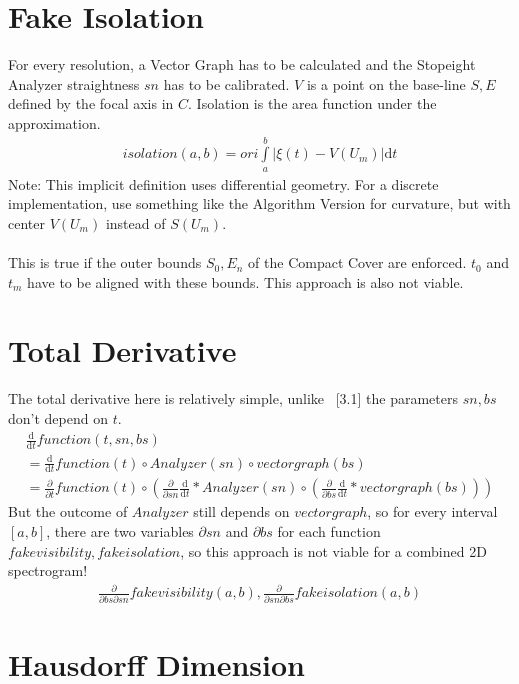 \documentclass{report}
\begin{document}
\section{Fake Isolation}
For every resolution, a Vector Graph has to be calculated and the Stopeight Analyzer straightness $sn$ has to be calibrated. $V$ is a point on the base-line $S,E$ defined by the focal axis in $C$.
Isolation is the area function under the approximation.
\begin{align}
isolation(a,b)= ori \int \limits _{a}^{b} \vert \xi(t)-V(U_{m})\vert  \mathrm{d}t
\end{align}
Note: This implicit definition uses differential geometry. For a discrete implementation, use something like the Algorithm Version for curvature, but with center $V(U_{m})$ instead of $S(U_{m})$.\\\\
This is true if the outer bounds $S_{0},E_{n}$ of the Compact Cover are enforced. $t_{0}$ and $t_{m}$ have to be aligned with these bounds.
This approach is also not viable.

\section{Total Derivative}
The total derivative here is relatively simple, unlike ~\cite{Analyzer}[3.1] the parameters $sn,bs$ don't depend on $t$.
\begin{align}
\frac{\mathrm{d}}{\mathrm{d} t} function(t,sn,bs)\\
= \frac{\mathrm{d}}{\mathrm{d} t} function(t) \circ Analyzer(sn) \circ vectorgraph(bs)\\
= \frac{\partial}{\partial t} function(t) \circ ( \frac{\partial}{\partial sn}  \frac{\mathrm{d} }{\mathrm{d}t} * Analyzer(sn) \circ (\frac{\partial}{\partial bs} \frac{\mathrm{d}}{\mathrm{d}t}*vectorgraph(bs)) )
\end{align}
But the outcome of $Analyzer$ still depends on $vectorgraph$, so for every interval $[a,b]$, there are two variables $\partial sn$ and $\partial bs$ for each function $fake visibility, fake isolation$, so this approach is not viable for a combined 2D spectrogram!
\begin{align}
\frac{\partial}{\partial bs\partial sn} fakevisibility(a,b),\frac{\partial}{\partial sn\partial bs} fakeisolation(a,b)
\end{align}

\section{Hausdorff Dimension}
\end{document}
